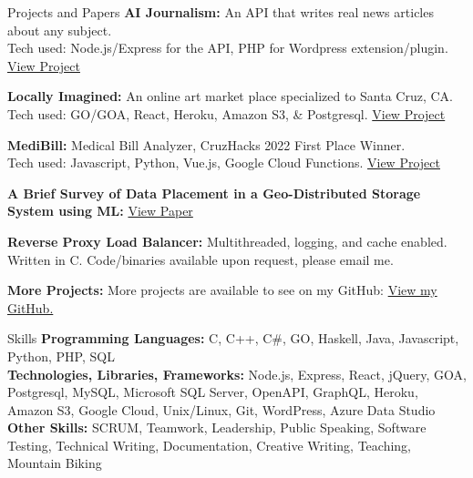 \documentclass{resume} %
\begin{document}
\begin{rSection}{Projects and Papers}
    {\bf{AI Journalism:}} An API that writes real news articles about any subject.
    \\ Tech used: Node.js/Express for the API, PHP for Wordpress extension/plugin. \href{https://github.com/azsteinb/AIJournalism}{View Project}
    
    {\bf{Locally Imagined:}} An online art market place specialized to Santa Cruz, CA.
    \\ Tech used: GO/GOA, React, Heroku, Amazon S3, \& Postgresql. \href{https://locallyimagined.com/}{View Project}
    
    {\bf{MediBill:}} Medical Bill Analyzer, CruzHacks 2022 First Place Winner.
    \\Tech used: Javascript, Python, Vue.js, Google Cloud Functions. \href{https://devpost.com/software/health-hacker-7soucr}{View Project}
    
    {\bf{A Brief Survey of Data Placement in a Geo-Distributed Storage System using ML}: } \href{https://docs.google.com/document/u/1/d/e/2PACX-1vRi_JSl3urSJMr-Mj7rZGkyrPzMANauaqdgXekPwFfHyUSlrkR0azLyoCxT_S0u2tvndypQ5d6vsJwy/pub}{View Paper}
    
    {\bf{Reverse Proxy Load Balancer:} } Multithreaded, logging, and cache enabled. Written in C. Code/binaries available upon request, please email me.
    
    {\bf{More Projects:} } More projects are available to see on my GitHub: \href{https://github.com/azsteinb}{View my GitHub.}
\end{rSection}

\begin{rSection}{Skills}
    {\bf{Programming Languages:} } C, C++, C\#, GO, Haskell, Java, Javascript, Python, PHP, SQL
    \\{\bf{Technologies, Libraries, Frameworks:} } Node.js, Express, React, jQuery, GOA, Postgresql, MySQL, Microsoft SQL Server, OpenAPI, GraphQL, Heroku, Amazon S3, Google Cloud, Unix/Linux, Git, WordPress, Azure Data Studio
    \\{\bf{Other Skills:} } SCRUM, Teamwork, Leadership, Public Speaking, Software Testing, Technical Writing, Documentation, Creative Writing, Teaching, Mountain Biking
\end{rSection}
    
\end{document}
